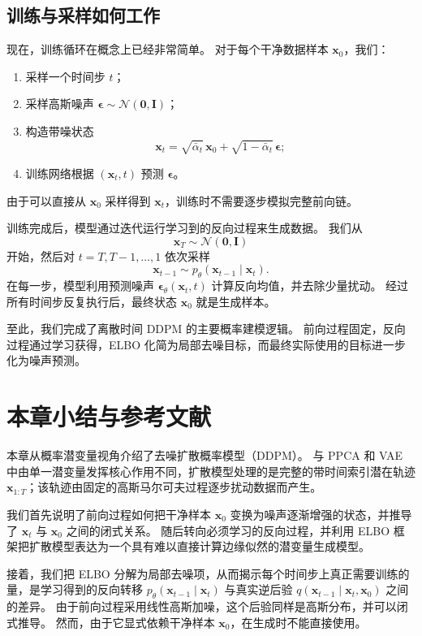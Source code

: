 \subsection{训练与采样如何工作}

现在，训练循环在概念上已经非常简单。
对于每个干净数据样本 $\mathbf{x}_0$，我们：
\begin{enumerate}
    \item 采样一个时间步 $t$；
    \item 采样高斯噪声 $\boldsymbol{\epsilon}\sim\mathcal{N}(\mathbf{0},\mathbf{I})$；
    \item 构造带噪状态
    \[
    \mathbf{x}_t
    =
    \sqrt{\bar{\alpha}_t}\,\mathbf{x}_0
    +
    \sqrt{1-\bar{\alpha}_t}\,\boldsymbol{\epsilon};
    \]
    \item 训练网络根据 $(\mathbf{x}_t,t)$ 预测 $\boldsymbol{\epsilon}$。
\end{enumerate}
由于可以直接从 $\mathbf{x}_0$ 采样得到 $\mathbf{x}_t$，训练时不需要逐步模拟完整前向链。

训练完成后，模型通过迭代运行学习到的反向过程来生成数据。
我们从
\[
\mathbf{x}_T\sim\mathcal{N}(\mathbf{0},\mathbf{I})
\]
开始，然后对 $t=T,T-1,\dots,1$ 依次采样
\[
\mathbf{x}_{t-1}\sim p_\theta(\mathbf{x}_{t-1}\mid \mathbf{x}_t).
\]
在每一步，模型利用预测噪声
$\boldsymbol{\epsilon}_\theta(\mathbf{x}_t,t)$ 计算反向均值，并去除少量扰动。
经过所有时间步反复执行后，最终状态 $\mathbf{x}_0$ 就是生成样本。

\bigskip
\noindent
至此，我们完成了离散时间 DDPM 的主要概率建模逻辑。
前向过程固定，反向过程通过学习获得，ELBO 化简为局部去噪目标，而最终实际使用的目标进一步化为噪声预测。

\section*{本章小结与参考文献}

本章从概率潜变量视角介绍了去噪扩散概率模型（DDPM）。
与 PPCA 和 VAE 中由单一潜变量发挥核心作用不同，扩散模型处理的是完整的带时间索引潜在轨迹
$\mathbf{x}_{1:T}$；该轨迹由固定的高斯马尔可夫过程逐步扰动数据而产生。

我们首先说明了前向过程如何把干净样本 $\mathbf{x}_0$ 变换为噪声逐渐增强的状态，并推导了 $\mathbf{x}_t$ 与 $\mathbf{x}_0$ 之间的闭式关系。
随后转向必须学习的反向过程，并利用 ELBO 框架把扩散模型表达为一个具有难以直接计算边缘似然的潜变量生成模型。

接着，我们把 ELBO 分解为局部去噪项，从而揭示每个时间步上真正需要训练的量，是学习得到的反向转移
$p_\theta(\mathbf{x}_{t-1}\mid \mathbf{x}_t)$ 与真实逆后验
$q(\mathbf{x}_{t-1}\mid \mathbf{x}_t,\mathbf{x}_0)$ 之间的差异。
由于前向过程采用线性高斯加噪，这个后验同样是高斯分布，并可以闭式推导。
然而，由于它显式依赖干净样本 $\mathbf{x}_0$，在生成时不能直接使用。


